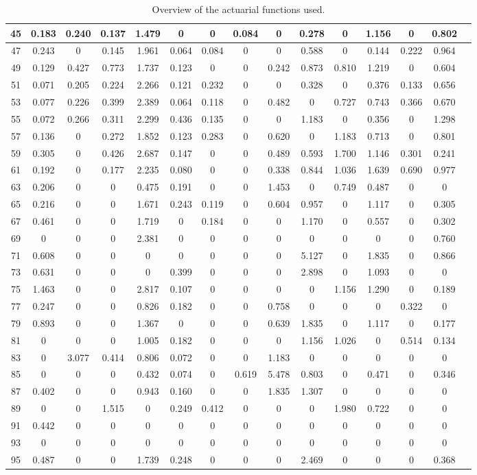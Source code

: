 \begin{table*}[htb]
\begin{tabular}{|c |c |c |c |c |c |c |c |c |c |c |c |c |c |c|}
45&0.183& 0.240& 0.137& 1.479& 0& 0& 0.084& 0& 0.278& 0& 1.156& 0& 0.802\\\hline
47&0.243& 0& 0.145& 1.961& 0.064& 0.084& 0& 0& 0.588& 0& 0.144& 0.222& 0.964\\\hline
49&0.129& 0.427& 0.773& 1.737& 0.123& 0& 0& 0.242& 0.873& 0.810& 1.219& 0& 0.604\\\hline
51&0.071& 0.205& 0.224& 2.266& 0.121& 0.232& 0& 0& 0.328& 0& 0.376& 0.133& 0.656\\\hline
53&0.077& 0.226& 0.399& 2.389& 0.064& 0.118& 0& 0.482& 0& 0.727& 0.743& 0.366& 0.670\\\hline
55&0.072& 0.266& 0.311& 2.299& 0.436& 0.135& 0& 0& 1.183& 0& 0.356& 0& 1.298\\\hline
57&0.136& 0& 0.272& 1.852& 0.123& 0.283& 0& 0.620& 0& 1.183& 0.713& 0& 0.801\\\hline
59&0.305& 0& 0.426& 2.687& 0.147& 0& 0& 0.489& 0.593& 1.700& 1.146& 0.301& 0.241\\\hline
61&0.192& 0& 0.177& 2.235& 0.080& 0& 0& 0.338& 0.844& 1.036& 1.639& 0.690& 0.977\\\hline
63&0.206& 0& 0& 0.475& 0.191& 0& 0& 1.453& 0& 0.749& 0.487& 0& 0\\\hline
65&0.216& 0& 0& 1.671& 0.243& 0.119& 0& 0.604& 0.957& 0& 1.117& 0& 0.305\\\hline
67&0.461& 0& 0& 1.719& 0& 0.184& 0& 0& 1.170& 0& 0.557& 0& 0.302\\\hline
69&0& 0& 0& 2.381& 0& 0& 0& 0& 0& 0& 0& 0& 0.760\\\hline
71&0.608& 0& 0& 0& 0& 0& 0& 0& 5.127& 0& 1.835& 0& 0.866\\\hline
73&0.631& 0& 0& 0& 0.399& 0& 0& 0& 2.898& 0& 1.093& 0& 0\\\hline
75&1.463& 0& 0& 2.817& 0.107& 0& 0& 0& 0& 1.156& 1.290& 0& 0.189\\\hline
77&0.247& 0& 0& 0.826& 0.182& 0& 0& 0.758& 0& 0& 0& 0.322& 0\\\hline
79&0.893& 0& 0& 1.367& 0& 0& 0& 0.639& 1.835& 0& 1.117& 0& 0.177\\\hline
81&0& 0& 0& 1.005& 0.182& 0& 0& 0& 1.156& 1.026& 0& 0.514& 0.134\\\hline
83&0& 3.077& 0.414& 0.806& 0.072& 0& 0& 1.183& 0& 0& 0& 0& 0\\\hline
85&0& 0& 0& 0.432& 0.074& 0& 0.619& 5.478& 0.803& 0& 0.471& 0& 0.346\\\hline
87&0.402& 0& 0& 0.943& 0.160& 0& 0& 1.835& 1.307& 0& 0& 0& 0\\\hline
89&0& 0& 1.515& 0& 0.249& 0.412& 0& 0& 0& 1.980& 0.722& 0& 0\\\hline
91&0.442& 0& 0& 0& 0& 0& 0& 0& 0& 0& 0& 0& 0\\\hline
93&0& 0& 0& 0& 0& 0& 0& 0& 0& 0& 0& 0& 0\\\hline
95&0.487& 0& 0& 1.739& 0.248& 0& 0& 0& 2.469& 0& 0& 0& 0.368\\\hline

    \end{tabular}
    \caption{Overview of the actuarial functions used.}
    \label{table:probabilityItems}
\end{table*}
    

